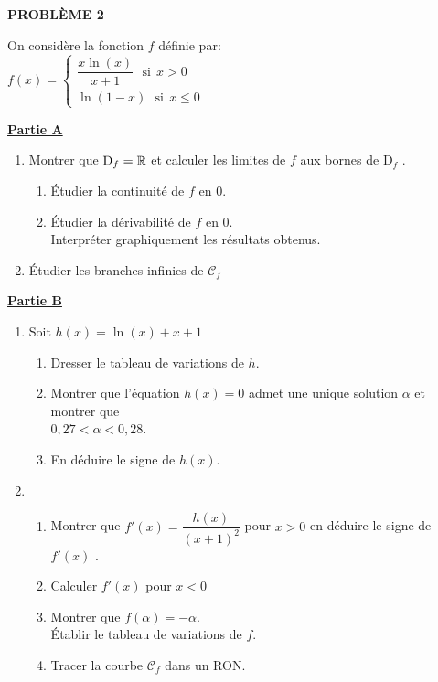 \vspace{1cm}

\textbf{PROBLÈME 2}

On considère la fonction $ f $ définie par: \\   $f(x)=\left \{\begin{array}{l} \dfrac{x\ln(x)}{x+1}~~~ \textrm{si}~~ x> 0 ~\\[0.5cm] \ln(1-x)~~~ \textrm{si}~~ x\leq 0 \end{array}\right.$


\medskip
\underline{\textbf{Partie A}}

\medskip
 \begin{enumerate}
\item Montrer que $ \text{D}_{f} =\mathbb{R}$ et calculer les limites  de $ f $ aux bornes  de $ \text{D}_{f} $ .
\begin{enumerate}
\item Étudier la continuité de $ f $  en $ 0 $.
\item Étudier la dérivabilité de $ f $  en $ 0 $.\\ Interpréter graphiquement les résultats obtenus.
\end{enumerate}
 \item Étudier les branches infinies  de  $\mathscr{C}_{f}$ 

\end{enumerate}


\medskip
\underline{\textbf{Partie B}}


\medskip


\begin{enumerate}
\item Soit $ h(x)=\ln(x)+x+1 $ 
\begin{enumerate}
\item Dresser le tableau de variations de $ h $.
\item  Montrer que l'équation $ h(x)=0 $ admet une unique solution $ \alpha $   et montrer  que\\ $ 0,27<\alpha <0,28 $.
\item  En déduire le signe de $ h(x)$.
\end{enumerate}
\item 
\begin{enumerate}
\item Montrer que  $ f'(x)=\dfrac{h(x)}{(x+1)^{2}} $ pour $ x>0 $ en déduire le signe de $ f'(x) $ .
\item Calculer $ f'(x)$ pour $ x<0 $
\item  Montrer  que $ f(\alpha)=-\alpha $.\\ Établir le tableau de variations de $ f $.
\item Tracer la courbe  $\mathscr{C}_{f}$   dans un RON.
\end{enumerate}
\end{enumerate}

